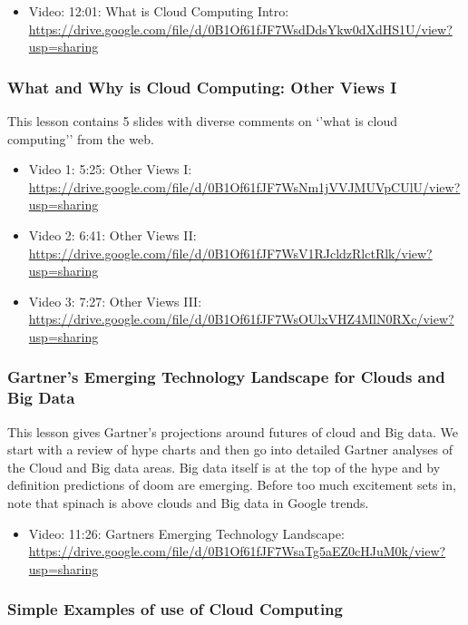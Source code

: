 \begin{itemize}
\tightlist
\item
  Video: 12:01: What is Cloud Computing Intro:
  \url{https://drive.google.com/file/d/0B1Of61fJF7WsdDdsYkw0dXdHS1U/view?usp=sharing}
\end{itemize}

\subsubsection{What and Why is Cloud Computing: Other Views I}

This lesson contains 5 slides with diverse comments on `'what is cloud
computing'' from the web.

\begin{itemize}
\item
  Video 1: 5:25: Other Views I:
  \url{https://drive.google.com/file/d/0B1Of61fJF7WsNm1jVVJMUVpCUlU/view?usp=sharing}
\item
  Video 2: 6:41: Other Views II:
  \url{https://drive.google.com/file/d/0B1Of61fJF7WsV1RJcldzRlctRlk/view?usp=sharing}
\item
  Video 3: 7:27: Other Views III:
  \url{https://drive.google.com/file/d/0B1Of61fJF7WsOUlxVHZ4MlN0RXc/view?usp=sharing}
\end{itemize}

\subsubsection{Gartner's Emerging Technology Landscape for Clouds and
  Big Data}\label{gartners-emerging-technology-landscape-for-clouds-and-big-data}

This lesson gives Gartner's projections around futures of cloud and Big
data. We start with a review of hype charts and then go into detailed
Gartner analyses of the Cloud and Big data areas. Big data itself is at
the top of the hype and by definition predictions of doom are emerging.
Before too much excitement sets in, note that spinach is above clouds
and Big data in Google trends.

\begin{itemize}
\item
  Video: 11:26: Gartners Emerging Technology Landscape:
  \url{https://drive.google.com/file/d/0B1Of61fJF7WsaTg5aEZ0cHJuM0k/view?usp=sharing}
\end{itemize}

\subsubsection{Simple Examples of use of Cloud Computing}

